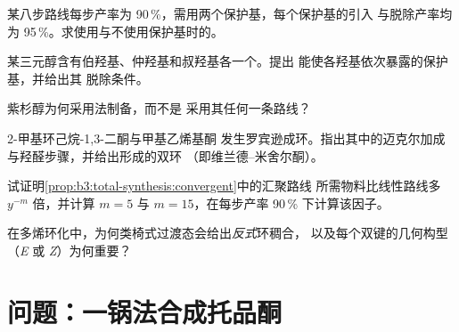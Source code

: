 \begin{exercise}[$\star\star$]\label{exo:b3:total-synthesis:7}
某八步路线每步产率为 90\,\%，需用两个保护基，每个保护基的引入
与脱除产率均为 95\,\%。求使用与不使用保护基时的。
\end{exercise}

\begin{exercise}[$\star\star$]\label{exo:b3:total-synthesis:8}
某三元醇含有伯羟基、仲羟基和叔羟基各一个。提出
能使各羟基依次暴露的保护基，并给出其
脱除条件。
\end{exercise}

\begin{exercise}[$\star\star$]\label{exo:b3:total-synthesis:9}
紫杉醇为何采用法制备，而不是
采用其任何一条路线？
\end{exercise}

\begin{exercise}[$\star\star\star$]\label{exo:b3:total-synthesis:10}
2-甲基环己烷-1,3-二酮与甲基乙烯基酮
发生罗宾逊成环。指出其中的迈克尔加成与羟醛步骤，并给出形成的双环
（即维兰德–米舍尔酮）。
\end{exercise}

\begin{exercise}[$\star\star\star$]\label{exo:b3:total-synthesis:11}
试证明\cref{prop:b3:total-synthesis:convergent}中的汇聚路线
所需物料比线性路线多 $y^{-m}$ 倍，并计算 $m = 5$ 与
$m = 15$，在每步产率 90\,\% 下计算该因子。
\end{exercise}

\begin{exercise}[$\star\star\star$]\label{exo:b3:total-synthesis:12}
在多烯环化中，为何类椅式过渡态会给出\textit{反式}环稠合，
以及每个双键的几何构型（\textit{E} 或 \textit{Z}）为何重要？
\end{exercise}

\section{问题：一锅法合成托品酮}

